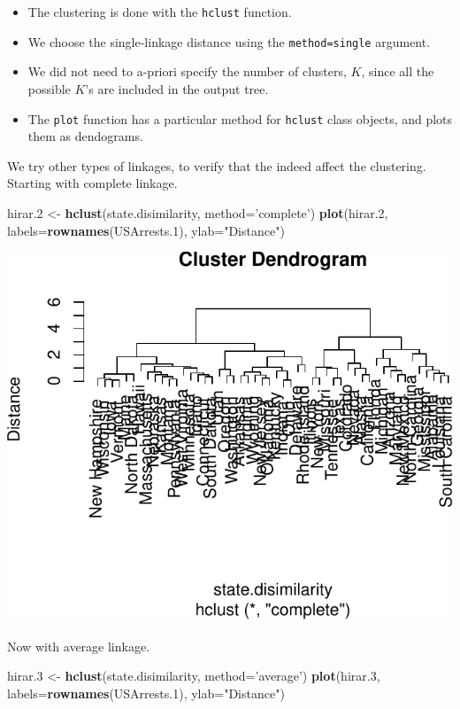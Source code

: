 \documentclass[]{book}
\newenvironment{Shaded}{\begin{snugshade}}{\end{snugshade}}
\newcommand{\DataTypeTok}[1]{\textcolor[rgb]{0.13,0.29,0.53}{#1}}
\newcommand{\FloatTok}[1]{\textcolor[rgb]{0.00,0.00,0.81}{#1}}
\newcommand{\KeywordTok}[1]{\textcolor[rgb]{0.13,0.29,0.53}{\textbf{#1}}}
\newcommand{\NormalTok}[1]{#1}
\newcommand{\StringTok}[1]{\textcolor[rgb]{0.31,0.60,0.02}{#1}}
\providecommand{\tightlist}{%
  \setlength{\itemsep}{0pt}\setlength{\parskip}{0pt}}
\theoremstyle{definition}
\theoremstyle{definition}
\theoremstyle{definition}
\theoremstyle{remark}
\begin{document}
\begin{itemize}
\tightlist
\item
  The clustering is done with the \texttt{hclust} function.
\item
  We choose the single-linkage distance using the \texttt{method=\textquotesingle{}single\textquotesingle{}} argument.
\item
  We did not need to a-priori specify the number of clusters, \(K\), since all the possible \(K\)'s are included in the output tree.
\item
  The \texttt{plot} function has a particular method for \texttt{hclust} class objects, and plots them as dendograms.
\end{itemize}

We try other types of linkages, to verify that the indeed affect the clustering.
Starting with complete linkage.

\begin{Shaded}
\begin{Highlighting}[]
\NormalTok{hirar}\FloatTok{.2}\NormalTok{ <-}\StringTok{ }\KeywordTok{hclust}\NormalTok{(state.disimilarity, }\DataTypeTok{method=}\StringTok{'complete'}\NormalTok{)}
\KeywordTok{plot}\NormalTok{(hirar}\FloatTok{.2}\NormalTok{, }\DataTypeTok{labels=}\KeywordTok{rownames}\NormalTok{(USArrests}\FloatTok{.1}\NormalTok{), }\DataTypeTok{ylab=}\StringTok{"Distance"}\NormalTok{)}
\end{Highlighting}
\end{Shaded}

\includegraphics[width=0.5\linewidth]{Rcourse_files/figure-latex/complete linkage-1}

Now with average linkage.

\begin{Shaded}
\begin{Highlighting}[]
\NormalTok{hirar}\FloatTok{.3}\NormalTok{ <-}\StringTok{ }\KeywordTok{hclust}\NormalTok{(state.disimilarity, }\DataTypeTok{method=}\StringTok{'average'}\NormalTok{)}
\KeywordTok{plot}\NormalTok{(hirar}\FloatTok{.3}\NormalTok{, }\DataTypeTok{labels=}\KeywordTok{rownames}\NormalTok{(USArrests}\FloatTok{.1}\NormalTok{), }\DataTypeTok{ylab=}\StringTok{"Distance"}\NormalTok{)}
\end{Highlighting}
\end{Shaded}
\end{document}
